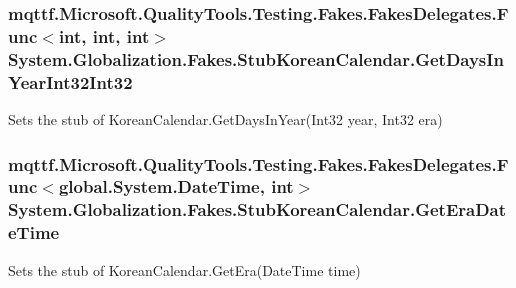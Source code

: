 \hypertarget{class_system_1_1_globalization_1_1_fakes_1_1_stub_korean_calendar_a89620a321b9183257ca250badd664921}{
\subsubsection[{Get\-Days\-In\-Year\-Int32\-Int32}]{\setlength{\rightskip}{0pt plus 5cm}mqttf.\-Microsoft.\-Quality\-Tools.\-Testing.\-Fakes.\-Fakes\-Delegates.\-Func$<$int, int, int$>$ System.\-Globalization.\-Fakes.\-Stub\-Korean\-Calendar.\-Get\-Days\-In\-Year\-Int32\-Int32}}\label{class_system_1_1_globalization_1_1_fakes_1_1_stub_korean_calendar_a89620a321b9183257ca250badd664921}


Sets the stub of Korean\-Calendar.\-Get\-Days\-In\-Year(\-Int32 year, Int32 era)

\hypertarget{class_system_1_1_globalization_1_1_fakes_1_1_stub_korean_calendar_aa7e16b5aaf037485721c8388d5e67982}{
\subsubsection[{Get\-Era\-Date\-Time}]{\setlength{\rightskip}{0pt plus 5cm}mqttf.\-Microsoft.\-Quality\-Tools.\-Testing.\-Fakes.\-Fakes\-Delegates.\-Func$<$global.\-System.\-Date\-Time, int$>$ System.\-Globalization.\-Fakes.\-Stub\-Korean\-Calendar.\-Get\-Era\-Date\-Time}}\label{class_system_1_1_globalization_1_1_fakes_1_1_stub_korean_calendar_aa7e16b5aaf037485721c8388d5e67982}


Sets the stub of Korean\-Calendar.\-Get\-Era(\-Date\-Time time)

